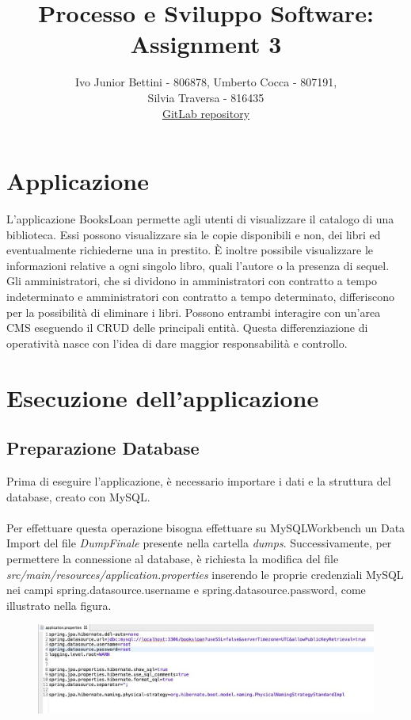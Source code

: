 \documentclass[a4paper,10pt]{article}
\title{Processo e Sviluppo Software: Assignment 3}
\author{Ivo Junior Bettini - 806878, Umberto Cocca - 807191, \\Silvia Traversa - 816435\\
\href{https://gitlab.com/s.traversa/2019_assignment3_booksloan}{GitLab repository}}
\date{}
\begin{document}
\maketitle 

\section*{Applicazione}
L'applicazione BooksLoan permette agli utenti di visualizzare il catalogo di una biblioteca. Essi possono visualizzare sia le copie disponibili e non, dei libri ed eventualmente richiederne una in prestito.
È inoltre possibile visualizzare le informazioni relative a ogni singolo libro, quali l'autore o la presenza di sequel.\\ 

\noindent Gli amministratori, che si dividono in amministratori con contratto a tempo indeterminato e amministratori con contratto a tempo determinato, differiscono per la possibilità di eliminare i libri. Possono entrambi interagire con un'area CMS eseguendo il CRUD delle principali entità. Questa differenziazione di operatività nasce con l'idea di dare maggior responsabilità e controllo.

\section*{Esecuzione dell'applicazione}
\subsection*{Preparazione Database}
Prima di eseguire l'applicazione, è necessario importare i dati e la struttura del database, creato con MySQL.\\\\
Per effettuare questa operazione bisogna effettuare su MySQLWorkbench un Data Import del file \textit{DumpFinale} presente nella cartella \textit{dumps}. Successivamente, per permettere la connessione al database, è richiesta la modifica del file \textit{src/main/resources/application.properties} inserendo le proprie credenziali MySQL nei campi spring.datasource.username e spring.datasource.password, come illustrato nella figura.\\
\begin{figure}[H]
	\centering
	\includegraphics[width=1\linewidth]{images/properties}
\end{figure}
\newpage
\end{document}
